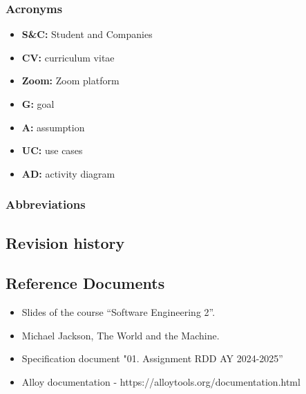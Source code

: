 \subsubsection{Acronyms}
\begin{itemize}
    \item \textbf{S\&C:} Student and Companies
    \item \textbf{CV:} curriculum vitae
    \item \textbf{Zoom:} Zoom platform
    \item \textbf{G:} goal
    \item \textbf{A:} assumption
    \item \textbf{UC:} use cases
    \item \textbf{AD:} activity diagram
\end{itemize}
\subsubsection{Abbreviations}
\subsection{Revision history}
\subsection{Reference Documents}
\begin{itemize}
    \item Slides of the course “Software Engineering 2”.
    \item Michael Jackson, The World and the Machine.
    \item Specification document "01. Assignment RDD AY 2024-2025”
    \item Alloy documentation - https://alloytools.org/documentation.html
\end{itemize}
